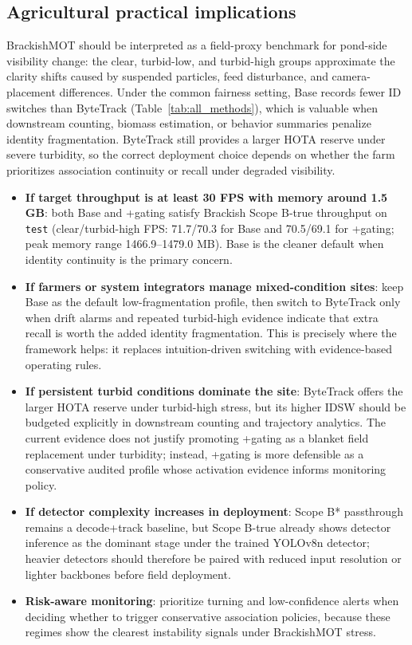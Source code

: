 \documentclass[5p,twocolumn,a4paper]{elsarticle}
\begin{document}
\subsection{Agricultural practical implications}
BrackishMOT should be interpreted as a field-proxy benchmark for pond-side visibility change: the clear, turbid-low, and turbid-high groups approximate the clarity shifts caused by suspended particles, feed disturbance, and camera-placement differences. Under the common fairness setting, Base records fewer ID switches than ByteTrack (Table~\ref{tab:all_methods}), which is valuable when downstream counting, biomass estimation, or behavior summaries penalize identity fragmentation. ByteTrack still provides a larger HOTA reserve under severe turbidity, so the correct deployment choice depends on whether the farm prioritizes association continuity or recall under degraded visibility.
\begin{itemize}
  \item \textbf{If target throughput is at least 30 FPS with memory around 1.5 GB}: both Base and +gating satisfy Brackish Scope B-true throughput on \texttt{test} (clear/turbid-high FPS: 71.7/70.3 for Base and 70.5/69.1 for +gating; peak memory range 1466.9--1479.0 MB). Base is the cleaner default when identity continuity is the primary concern.
  \item \textbf{If farmers or system integrators manage mixed-condition sites}: keep Base as the default low-fragmentation profile, then switch to ByteTrack only when drift alarms and repeated turbid-high evidence indicate that extra recall is worth the added identity fragmentation. This is precisely where the framework helps: it replaces intuition-driven switching with evidence-based operating rules.
  \item \textbf{If persistent turbid conditions dominate the site}: ByteTrack offers the larger HOTA reserve under turbid-high stress, but its higher IDSW should be budgeted explicitly in downstream counting and trajectory analytics. The current evidence does not justify promoting +gating as a blanket field replacement under turbidity; instead, +gating is more defensible as a conservative audited profile whose activation evidence informs monitoring policy.
  \item \textbf{If detector complexity increases in deployment}: Scope B* passthrough remains a decode+track baseline, but Scope B-true already shows detector inference as the dominant stage under the trained YOLOv8n detector; heavier detectors should therefore be paired with reduced input resolution or lighter backbones before field deployment.
  \item \textbf{Risk-aware monitoring}: prioritize turning and low-confidence alerts when deciding whether to trigger conservative association policies, because these regimes show the clearest instability signals under BrackishMOT stress.
\end{itemize}
\end{document}
